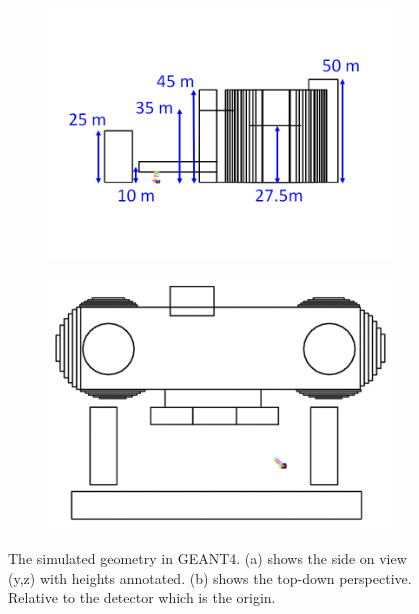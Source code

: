 \begin{figure}[!h]
\centering
\begin{subfigure}{.5\textwidth}
  \centering
  \includegraphics[width=\linewidth]{Chapter5/Figs/wylfaRasterNew/WylfaSimGeomSideOn.png}
  \captionsetup{width=.9\linewidth}
  \caption{}
  \label{subFig:WylfaSimGeomSideOn}
\end{subfigure}%
\begin{subfigure}{.5\textwidth}
  \centering
\includegraphics[width=\linewidth]{Chapter5/Figs/wylfaRasterNew/WylfaSimGeomTopDown.png}
  \captionsetup{width=.9\linewidth}
  \caption{}
  \label{subFig:WylfaSimGeomTopDown}
\end{subfigure}
\caption{The simulated geometry in GEANT4. (a) shows the side on view (y,z) with heights annotated. (b) shows the top-down perspective. Relative to the detector which is the origin.}
\label{fig:WylfaSimGeom_SideOn_TopDown}
\end{figure}

